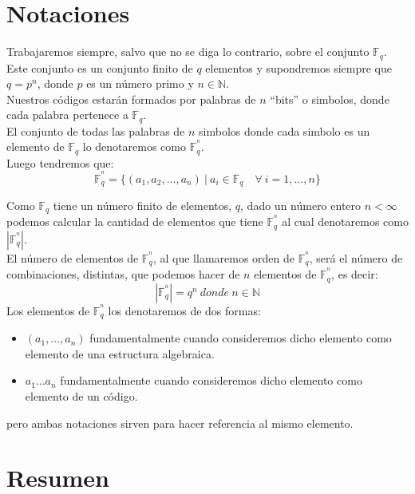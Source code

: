 \section{Notaciones}

Trabajaremos siempre, salvo que no se diga lo contrario, sobre el conjunto
$\mathbb{F}_q$. Este conjunto es un conjunto finito de $q$ elementos y
supondremos siempre que $q=p^n$, donde $p$ es un n\'umero primo y $n\in
\mathbb{N}$.\\

Nuestros c\'odigos estar\'an formados por palabras de $n$ ``bits'' o simbolos,
donde cada palabra pertenece a $\mathbb{F}_q$.\\

El conjunto de todas las palabras de $n$ simbolos donde cada simbolo es un
elemento de $\mathbb{F}_q$ lo denotaremos como $\mathbb{F}^{^n}_q$.\\

Luego tendremos que:
\begin{displaymath}
\mathbb{F}^{^n}_q = \{(a_1,a_2,\dots,a_n)\ |\ a_i\in \mathbb{F}_q\quad \forall \
i=1,\dots,n\}
\end{displaymath}

Como $\mathbb{F}_q$ tiene un n\'umero finito de elementos, $q$, dado un n\'umero
entero $n<\infty$ podemos calcular la cantidad de elementos que tiene
$\mathbb{F}^{^n}_q$ al cual denotaremos como $|\mathbb{F}^{^n}_q|$.\\

El n\'umero de elementos de $\mathbb{F}^{^n}_q$, al que llamaremos orden de
$\mathbb{F}^{^n}_q$, ser\'a el n\'umero de combinaciones, distintas, que podemos
hacer de $n$ elementos de $\mathbb{F}^{^n}_q$, es decir:
\begin{displaymath}
|\mathbb{F}^{^n}_q| = q^n\ donde\ n\in \mathbb{N}
\end{displaymath}
%
Los elementos de $\mathbb{F}^{^n}_q$ los denotaremos de dos formas:
\begin{itemize}
\item $(a_1,\dots,a_n)$ fundamentalmente cuando consideremos dicho elemento como
elemento de una estructura algebraica.
\item $a_1\dots a_n$ fundamentalmente cuando consideremos dicho elemento como
elemento de un c\'odigo.
\end{itemize}
pero ambas notaciones sirven para hacer referencia al mismo elemento.

\section{Resumen}

